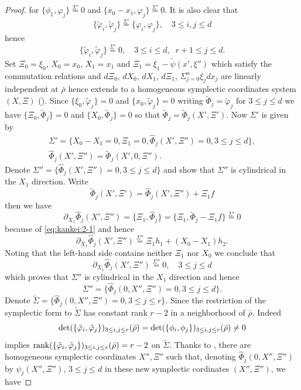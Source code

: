 \documentclass[12pt,leqno]{article} %
\def\dif{\partial}
\def\sieq{\overset{\Sigma'}{=}}
\def\sieqb{\overset{\Sigma''}{=}}
\def\bro{\bar\rho}
\def\bro{\bar\rho}
\numberwithin{equation}{section}
\begin{document}
\begin{proof}
%
for $\{\phi_1,\varphi_j\}\sieq 0$ and $\{x_0-x_1, \varphi_j\}\sieq 0$. It is also clear that
%
\[
\{\tilde\varphi_i,\tilde\varphi_j\}\sieq \{\varphi_i,\varphi_j\},\quad 3\leq i,j\leq d
\]
%
hence
%
\begin{equation}
\label{eq:kankei:3}
\{\tilde\varphi_i,\tilde\varphi_j\}\sieq 0,\quad 3\leq i\leq d, \;\;r+1\leq j\leq d.
\end{equation}
%
%
Set $\Xi_0=\xi_0$, $X_0=x_0$, $X_1=x_1$ and $\Xi_1=\xi_1-\tilde\psi(x',\xi'')$ which satisfy the commutation relations and $d\Xi_0$, $dX_0$, $dX_1$, $d\Xi_1$, $\Sigma_{j=0}^n\xi_jdx_j$ are linearly independent at $\bro$ hence extends to a homogeneous symplectic coordinates system $(X,\Xi)$ (\cite[Theorem 21.1.9]{MR781536}).  Since $\{\xi_0, \tilde\varphi_j\}=0$ and $\{x_0,\tilde\varphi_j\}=0$ writing $\tilde\Phi_j=\tilde\varphi_j$ for $3\leq j\leq d$ we have $\{\Xi_0,\tilde\Phi_j\}=0$ and $\{X_0,\tilde\Phi_j\}=0$ so that $\tilde\Phi_j=\tilde\Phi_j(X',\Xi')$. Now $\Sigma'$ is given by
%
\begin{gather*}
\Sigma'=\{X_0-X_1=0, \Xi_1=0, \hat\Phi_j(X',\Xi'')=0, 3\leq j\leq d\},\\
 \hat\Phi_j(X', \Xi'')=\tilde\Phi_j(X', 0,\Xi'').
\end{gather*}
%
Denote $
\Sigma''=\{\hat\Phi_j(X', \Xi'')=0, 3\leq j\leq d\}$ 
and show that $\Sigma''$ is cylindrical in the $X_1$ direction. Write
%
\begin{equation}
\label{eq:kankei:5}
\tilde\Phi_j(X',\Xi')=\hat\Phi_j(X', \Xi'')+\Xi_1f
\end{equation}
%
then we have
%
\[
\dif_{X_1}\hat\Phi_j(X',\Xi'')=\{\Xi_1, \hat\Phi_j\}=\{\Xi_1, \tilde\Phi_j-\Xi_1f\}\sieq 0
\]
%
because of \eqref{eq:kankei:2-1} and hence
%
\[
\dif_{X_1}\hat\Phi_j(X',\Xi'')\sieqb \Xi_1h_1+(X_0-X_1)h_2.
\]
%
Noting that the left-hand side contains neither $\Xi_1$ nor $X_0$ we conclude that
%
\[
\dif_{X_1}\hat\Phi_j(X',\Xi'')\sieqb 0,\quad 3\leq j\leq d
\]
%
which proves that $\Sigma''$ is cylindrical in the $X_1$ direction and hence
%
\[
\Sigma''=\{\hat\Phi_j(0,X'',\Xi'')=0, 3\leq j\leq d\}.
\]
%
Denote $\tilde\Sigma=\{\hat\Phi_j(0,X'',\Xi'')=0, 3\leq j\leq r\}$. 
Since the restriction of the symplectic form to $\tilde\Sigma$ has constant rank $r-2$ in a neighborhood of $\bro$. Indeed 
%
\[
{\rm det}(\{\tilde\varphi_i,\tilde\varphi_j\})_{3\leq i, j\leq r}(\bro)={\rm det}(\{\phi_i,\phi_j\})_{3\leq i,j\leq r}(\bro)\neq 0
\]
%
implies ${\rm rank}(\{\tilde\varphi_i,\tilde\varphi_j\})_{3\leq i, j\leq r}(\bro)=r-2$ on $\tilde\Sigma$. 
Thanks to \cite[Theorem 21.2.4]{MR781536},  there are homogeneous symplectic coordinates $X'', \Xi''$ such that, denoting $\hat\Phi_j(0,X'',\Xi'')$ by $\psi_j(X'',\Xi'')$, $3\leq j\leq d$ in these new symplectic cordinates $(X'',\Xi'')$, we have

\end{proof}
\end{document}
